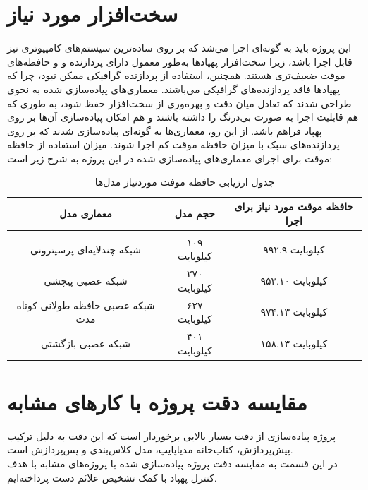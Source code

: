 \section{سخت‌افزار مورد نیاز}
این پروژه باید به گونه‌ای اجرا می‌شد که بر روی ساده‌ترین سیستم‌های کامپیوتری نیز قابل اجرا باشد، زیرا سخت‌افزار پهپادها به‌طور معمول دارای پردازنده‌ و و حافظه‌های موقت 
ضعیف‌تری هستند. همچنین، استفاده از پردازنده گرافیکی ممکن نبود، چرا که پهپادها فاقد پردازنده‌های گرافیکی می‌باشند. 
معماری‌های پیاده‌سازی شده به نحوی طراحی شدند که تعادل میان دقت و بهره‌وری از سخت‌افزار حفظ شود، به طوری که هم قابلیت اجرا به صورت بی‌درنگ را داشته باشند و هم امکان پیاده‌سازی آن‌ها بر روی پهپاد فراهم باشد. از این رو، معماری‌ها به گونه‌ای پیاده‌سازی شدند که بر روی پردازنده‌های سبک با میزان حافظه موقت کم اجرا شوند.
میزان استفاده از حافظه موقت برای اجرای معماری‌های پیاده‌سازی شده در این پروژه به شرح زیر است:



\begin{table}[h!]
    \centering
    \begin{tabular}{||c c c||}
     \hline
     \rule{0pt}{3ex}معماری مدل & حجم مدل & حافظه موقت مورد نیاز برای اجرا \\ [1.5ex]
     \hline
     \hline
     \rule{0pt}{0.5ex} & & \\  %
     شبکه چندلایه‌ای پرسپترونی & ۱۰۹ کیلوبایت & ۹۹۲.۹ کیلوبایت \\ [2.5ex]
     شبکه عصبی پیچشی & ۲۷۰ کیلوبایت & ۹۵۳.۱۰ کیلوبایت \\ [2.5ex]
     شبکه عصبی  حافظه طولانی کوتاه مدت & ۶۲۷ کیلوبایت & ۹۷۴.۱۳ کیلوبایت \\ [2.5ex]
     شبکه عصبی بازگشتي & ۴۰۱ کیلوبایت & ۱۵۸.۱۳ کیلوبایت \\ [2.5ex]
     \hline
    \end{tabular}
    \caption{جدول ارزیابی حافظه موفت موردنیاز مدل‌ها}
    \label{table:4}
\end{table}

\section{مقایسه دقت پروژه با کارهای مشابه}
پروژه پیاده‌سازی از دقت بسیار بالایی برخوردار است که این دقت به دلیل ترکیب پیش‌پردازش، کتاب‌خانه مدیاپایپ، مدل کلاس‌بندی و پس‌پردازش است. 
\\ در این قسمت به مقایسه دقت پروژه پیاده‌سازی شده با پروژه‌های مشابه با هدف کنترل پهپاد با کمک تشخیص علائم دست پرداخته‌ایم.

